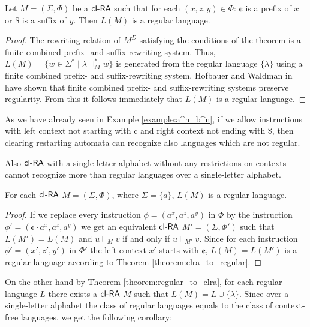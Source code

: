 \begin{theorem}\label{theorem:clra_to_regular}
Let $M=(\Sigma,\Phi)$ be a $\textup{\sf cl-RA\/}$ such that for each $(x, z, y) \in \Phi$: $\cent$ is a prefix of $x$ or $\$$ is a suffix of $y$. Then $L(M)$ is a regular language.
\end{theorem}

\begin{proof}
The rewriting relation of $M^D$ satisfying the conditions of the theorem is a finite combined prefix- and suffix rewriting system. Thus, $L(M)=\{ w \in \Sigma^* \mid \lambda \dashv_M^* w \}$ is generated from the regular language $\{\lambda\}$ using a finite combined prefix- and suffix-rewriting system. Hofbauer and Waldman in \cite{Hofbauer2004301} have shown that finite combined prefix- and suffix-rewriting systems preserve regularity. From this it follows immediately that $L(M)$ is a regular language.
\end{proof}

As we have already seen in Example \ref{example:a^n_b^n}, if we allow instructions with left context not starting with $\cent$ and right context not ending with $\$$, then clearing restarting automata can recognize also languages which are not regular.

Also $\textup{\sf cl-RA\/}$ with a single-letter alphabet without any restrictions on contexts cannot recognize more than regular languages over a single-letter alphabet.

\begin{lemma}
For each $\textup{\sf cl-RA\/}$ $M = (\Sigma, \Phi)$, where $\Sigma = \{a\}$, $L(M)$ is a regular language.
\end{lemma}

\begin{proof}
If we replace every instruction $\phi = (a^x, a^z, a^y)$ in $\Phi$ by the instruction $\phi' = (\cent \cdot a^x, a^z, a^y)$ we get an equivalent $\textup{\sf cl-RA\/}$ $M' = (\Sigma, \Phi')$ such that $L(M')=L(M)$ and $u \vdash_M v$ if and only if $u \vdash_{M'} v$. Since for each instruction $\phi' = (x', z', y')$ in $\Phi'$ the left context $x'$ starts with $\cent$, $L(M) = L(M')$ is a regular language according to Theorem \ref{theorem:clra_to_regular}.
\end{proof}

On the other hand by Theorem \ref{theorem:regular_to_clra}, for each regular language $L$ there exists a $\textup{\sf cl-RA\/}$ $M$ such that $L(M) = L \cup \{\lambda\}$. Since over a single-letter alphabet the class of regular languages equals to the class of context-free languages, we get the following corollary:

